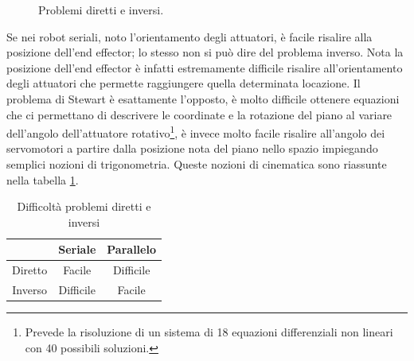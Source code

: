 \documentclass[11pt]{article}
\begin{document}
\begin{figure}[h!]
\centering
{}
\caption{Problemi diretti e inversi.} \label{fig:direttoinverso}
\end{figure}

Se nei robot seriali, noto l'orientamento degli attuatori, è facile risalire alla posizione dell'end effector; lo stesso non si può dire del problema inverso. Nota la posizione dell'end effector è infatti estremamente difficile risalire all'orientamento degli attuatori che permette raggiungere quella determinata locazione. Il problema di Stewart è esattamente l'opposto, è molto difficile ottenere equazioni che ci permettano di descrivere le coordinate e la rotazione del piano al variare dell'angolo dell'attuatore rotativo\footnote{Prevede la risoluzione di un sistema di 18 equazioni differenziali non lineari con 40 possibili soluzioni.}, è invece molto facile risalire all'angolo dei servomotori a partire dalla posizione nota del piano nello spazio impiegando semplici nozioni di trigonometria. Queste nozioni di cinematica sono riassunte nella tabella \ref{fig:tabella}.

\begin{table}[h!]
\centering
\begin{tabular}{c|cc}
        & Seriale   & Parallelo  \\ 
\hline
Diretto & Facile    & Difficile  \\
Inverso & Difficile & Facile    
\end{tabular}
\caption{Difficoltà problemi diretti e inversi} \label{fig:tabella}
\end{table}
\end{document}
